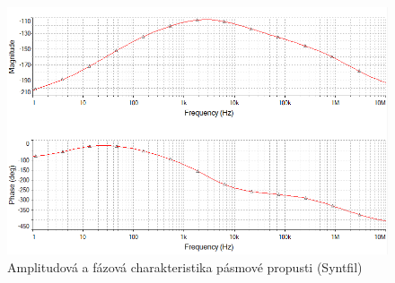\documentclass[twoside]{article}
\begin{document}
\begin{figure}[H]
\centering
\includegraphics[scale=0.6]{maple42.png}
\caption{Amplitudová a fázová charakteristika pásmové propusti (Syntfil)}
\end{figure}
\end{document}
